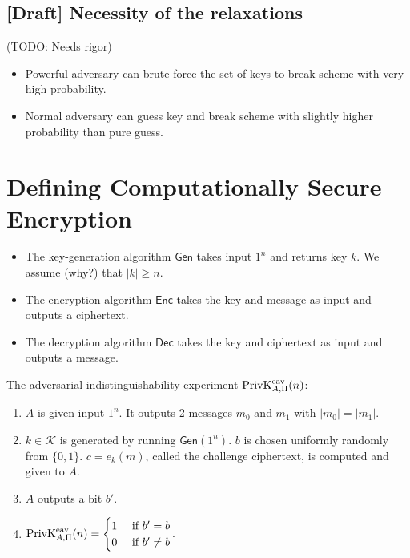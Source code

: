 \subsection{[Draft] Necessity of the relaxations}

(TODO: Needs rigor)

\begin{itemize}
\item Powerful adversary can brute force the set of keys to break scheme with very high probability.
\item Normal adversary can guess key and break scheme with slightly higher probability than pure guess.
\end{itemize}

\section{Defining Computationally Secure Encryption}

\begin{itemize}
\item The key-generation algorithm $\textsf{Gen}$ takes input $1^n$ and returns key $k$.
We assume (why?) that $|k| \ge n$.
\item The encryption algorithm $\textsf{Enc}$ takes the key and message as input and outputs a ciphertext.
\item The decryption algorithm $\textsf{Dec}$ takes the key and ciphertext as input and outputs a message.
\end{itemize}

\begin{definition}
The adversarial indistinguishability experiment $\PrivKExpt{eav}{A,\Pi}(n)$:
\begin{enumerate}
\item $A$ is given input $1^n$. It outputs 2 messages $m_0$ and $m_1$ with $|m_0| = |m_1|$.
\item $k \in \mathcal{K}$ is generated by running $\textsf{Gen}(1^n)$.
$b$ is chosen uniformly randomly from $\{0, 1\}$.
$c = e_k(m)$, called the challenge ciphertext, is computed and given to $A$.
\item $A$ outputs a bit $b'$.
\item $\PrivKExpt{eav}{A,\Pi}(n) = \begin{cases}1 & \textrm{ if } b' = b \\ 0 & \textrm{ if } b' \neq b\end{cases}$.
\end{enumerate}
\end{definition}

